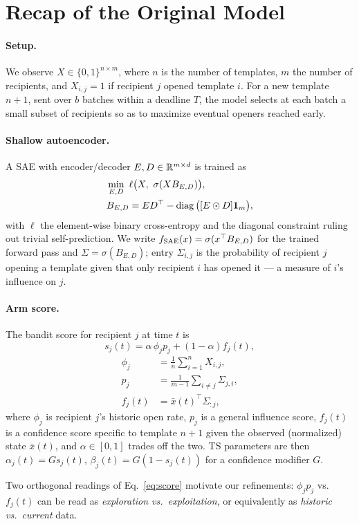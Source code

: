 \section{Recap of the Original Model}
\label{sec:recap}

\paragraph{Setup.}
We observe $X \in \{0,1\}^{n \times m}$, where $n$ is the number of
templates, $m$ the number of recipients, and $X_{i,j}=1$ if recipient $j$
opened template $i$. For a new template $n{+}1$, sent over $b$ batches
within a deadline $T$, the model selects at each batch a small subset of
recipients so as to maximize eventual openers reached early.

\paragraph{Shallow autoencoder.}
A SAE with encoder/decoder $E, D \in \mathbb{R}^{m\times d}$ is trained as
\begin{align*}
&\min_{E,D} \ \ell\big(X,\ \sigma(XB_{E,D})\big),\\
&B_{E,D} = ED^\top - \operatorname{diag}\big([E\odot D]\mathbf{1}_m\big),
\end{align*}
with $\ell$ the element-wise binary cross-entropy and the diagonal
constraint ruling out trivial self-prediction. We write
$f_{\mathrm{SAE}}(x) = \sigma(x^\top B_{E,D})$ for the trained forward pass and
$\Sigma = \sigma(B_{E,D})$; entry $\Sigma_{i,j}$ is the probability of
recipient $j$ opening a template given that only recipient $i$ has opened
it --- a measure of $i$'s influence on $j$.

\paragraph{Arm score.}
The bandit score for recipient $j$ at time $t$ is
\begin{equation}
\label{eq:score}
s_j(t) = \alpha\,\phi_j p_j + (1-\alpha) f_j(t),
\end{equation}
\begin{equation}
\label{eq:phi-p-f}
\begin{aligned}
\phi_j &= \frac1n\sum_{i=1}^n X_{i,j},\\
p_j &= \frac{1}{m-1}\sum_{i\ne j}\Sigma_{j,i},\\
f_j(t) &= \bar x(t)^\top \Sigma_{:j},
\end{aligned}
\end{equation}
where $\phi_j$ is recipient $j$'s historic open rate, $p_j$ is a general
influence score, $f_j(t)$ is a confidence score specific to template
$n{+}1$ given the observed (normalized) state $\bar x(t)$, and
$\alpha \in [0,1]$ trades off the two. TS parameters are then
$\alpha_j(t) = Gs_j(t)$, $\beta_j(t) = G(1-s_j(t))$ for a confidence
modifier $G$.

Two orthogonal readings of Eq.~\eqref{eq:score} motivate our refinements:
$\phi_j p_j$ vs.\ $f_j(t)$ can be read as \emph{exploration vs.\
exploitation}, or equivalently as \emph{historic vs.\ current} data.
